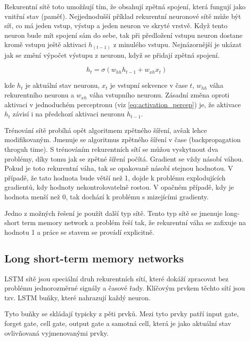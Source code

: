 \documentclass[FM,BP,fonts]{tulthesis}
\begin{document}
Rekurentní sítě toto umožňují tím, že obsahují zpětná spojení, která fungují jako vnitřní stav (paměť). Nejjednodušší příklad rekurentní neuronové sítě může být síť, co má jeden vstup, výstup a jeden neuron ve skryté vrstvě. Když tento neuron bude mít spojení sám do sebe, tak při předložení vstupu neuron dostane kromě vstupu ještě aktivaci $h_{(t-1)}$ z minulého vstupu. Nejnázornější je ukázat jak se změní výpočet výstupu z neuronu, když se přidají zpětná spojení.


\begin{equation}
	h_t = \sigma(w_{hh}h_{t-1} + w_{xh}x_t)
\end{equation}

kde $h_t$ je aktuální stav neuronu, $x_t$ je vstupní sekvence v čase $t$, $w_{hh}$ váha rekurentního neuronu a $w_{xh}$ váha vstupního neuronu. Zásadní změna oproti aktivaci v jednoduchém perceptronu (viz \ref{eq:activation_percep})  je, že aktivace $h_t$ závisí i na předchozí aktivaci neuronu $h_{t-1}$.

Trénování sítě probíhá opět algoritmem zpětného šíření, avšak lehce modifikovaným. Jmenuje se algoritmus zpětného šíření v čase (backpropagation throguh time). S trénováním rekurentních sítí se můžou vyskytnout dva problémy, díky tomu jak se zpětné šíření počítá. \cite{martinpilatRNN} Gradient se vždy násobí váhou. Pokud je toto rekurentní váha, tak se opakovaně násobí stejnou hodnotou. V případě, že tato hodnota bude větší než 1, dojde k problému explodujících gradientů, kdy hodnoty nekontrolovatelně rostou. V opačném případě, kdy je hodnota menší než 0, tak dochází k problému s mizejícími gradienty.

Jedno z možných řešení je použít další typ sítě. Tento typ sítě se jmenuje long-short term memory network a problém řeší tak, že rekurentní váha se zafixuje na hodnotu 1 a práce se stavem se provádí explicitně.



\subsection{Long short-term memory networks}\label{nn-lstm}
LSTM sítě jsou speciální druh rekurentních sítí, které dokáží zpracovat  bez problému jednorozměrné signály a časové řady. Klíčovým prvkem těchto sítí jsou tzv. LSTM buňky, které nahrazují každý neuron. 

Tyto buňky se skládají typicky z pěti prvků. Mezi tyto prvky patří input gate, forget gate, cell gate, output gate a samotná cell, která je jako aktuální stav ovlivňovaná vyjmenovanými prvky.
\end{document}
